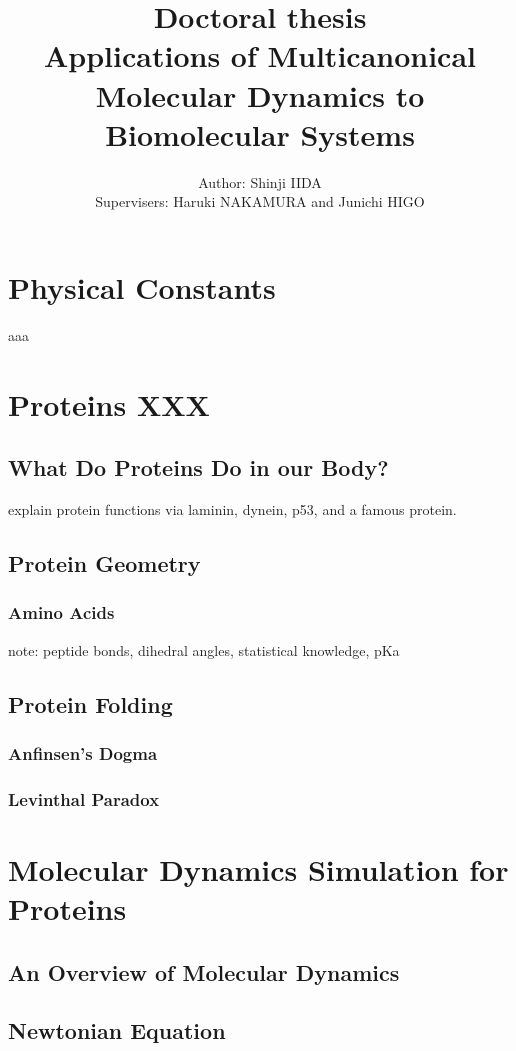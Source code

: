 \documentclass[12pts,a4paper,openany]{book}
\title{\Huge{Doctoral thesis} \\  Applications of Multicanonical Molecular Dynamics to Biomolecular Systems}
\author{Author: Shinji IIDA \\ Supervisers: Haruki NAKAMURA and Junichi HIGO}
\begin{document}

\maketitle




\chapter*{Physical Constants}
aaa\cite{Iida2016}
\tableofcontents

\chapter{Proteins XXX}
	\section{What Do Proteins Do in our Body?}
	{\color{red} explain protein functions via laminin, dynein, p53, and a famous protein.}
	\section{Protein Geometry}
		\subsection{Amino Acids}
			{\color{red} 
			note: peptide bonds, dihedral angles, statistical knowledge, pKa
			}
	\section{Protein Folding}
		\subsection{Anfinsen's Dogma}
		\subsection{Levinthal Paradox}
		
\chapter{Molecular Dynamics Simulation for Proteins}
	\section{An Overview of Molecular Dynamics}
	\section{Newtonian Equation}
\end{document}
